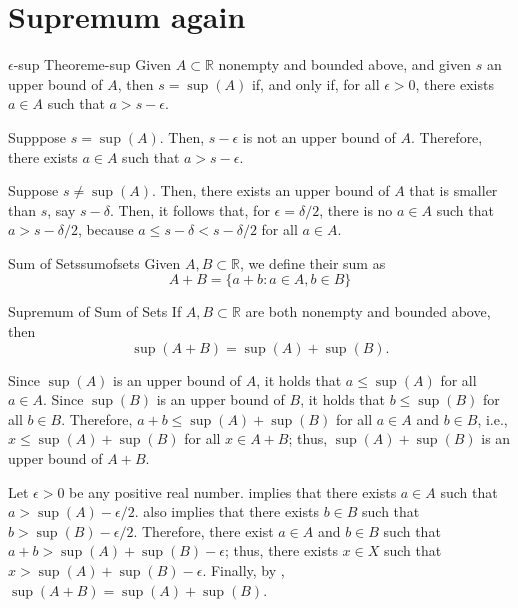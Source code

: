 \section{Supremum again}


\begin{thm}{\(\epsilon\)-sup Theorem}{e-sup}
	Given \(A \subset \mathbb{R}\) nonempty and bounded above, and given \(s\) an upper bound of \(A\), then \(s = \sup(A)\) if, and only if, for all \(\epsilon > 0\), there exists \(a \in A\) such that \(a > s - \epsilon\).
\end{thm}

\begin{dem}{}{}
	Supppose \(s = \sup(A)\). Then, \(s - \epsilon\) is not an upper bound of \(A\). Therefore, there exists \(a \in A\) such that \(a > s - \epsilon\).

	Suppose \(s \neq \sup(A)\). Then, there exists an upper bound of \(A\) that is smaller than \(s\), say \(s - \delta\). Then, it follows that, for \(\epsilon = \delta / 2\), there is no \(a \in A\) such that \(a > s - \delta/2\), because  \(a \leq s - \delta < s - \delta/2\) for all \(a \in A\).
\end{dem}

\begin{defn}{Sum of Sets}{sumofsets}
	Given \(A, B \subset \mathbb{R}\), we define their sum as \[
		A + B = \{a + b : a \in A, b \in B\}
	\]
\end{defn}

\begin{thm}{Supremum of Sum of Sets}{}
	If \(A, B \subset \mathbb{R}\) are both nonempty and bounded above, then \[
		\sup(A+B) = \sup(A) + \sup(B).
	\]
\end{thm}

\begin{dem}{}{}
	Since \(\sup(A)\) is an upper bound of \(A\), it holds that \(a \leq \sup(A)\) for all \(a \in A\).
	Since \(\sup(B)\) is an upper bound of \(B\), it holds that \(b \leq \sup(B)\) for all \(b \in B\).
	Therefore, \(a + b \leq \sup(A) + \sup(B)\) for all \(a \in A\) and \(b \in B\), i.e., \(x \leq \sup(A) + \sup(B)\) for all \(x \in A + B\); thus, \(\sup(A) + \sup(B)\) is an upper bound of \(A + B\).

	Let \(\epsilon > 0\) be any positive real number.
	 implies that there exists \(a \in A\) such that \(a > \sup(A) - \epsilon/2\).
	 also implies that there exists \(b \in B\) such that \(b > \sup(B) - \epsilon/2\).
	Therefore, there exist \(a \in A\) and \(b \in B\) such that \(a + b > \sup(A) + \sup(B) - \epsilon\); thus, there exists \(x \in X\) such that \(x > \sup(A) + \sup(B) - \epsilon\).
	Finally, by , \(\sup(A+B) = \sup(A) + \sup(B)\).
\end{dem}

